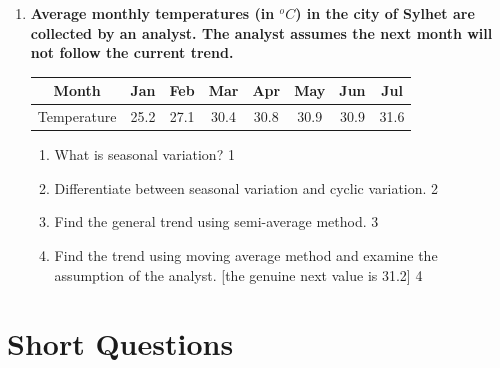 \documentclass[a4paper,oneside]{book}
\begin{document}
\begin{enumerate}
\begin{enumerate}
 \item
	  \textbf{Average monthly temperatures (in $^o C$) in the city of Sylhet are collected by an analyst. The analyst assumes the next month will not follow the current trend.} 
	  
	  \begin{table}[h]
	  \centering
\begin{tabular}{c|c|c|c|c|c|c|c}
Month & Jan & Feb & Mar & Apr & May & Jun & Jul \\ \hline
Temperature & 25.2 & 27.1 & 30.4 & 30.8 & 30.9 & 30.9 & 31.6
\end{tabular}
\end{table}
  
  \begin{enumerate}
    \item
	What is seasonal variation? \hfill 1
    \item
	Differentiate between seasonal variation and cyclic variation. \hfill 2
    \item  
	Find the general trend using semi-average method. \hfill 3
    \item
	Find the trend using moving average method and examine the assumption of the analyst. [the genuine next value is 31.2] \hfill 4
  \end{enumerate}

\end{enumerate}

\section{Short Questions}


\end{enumerate}
\end{document}
